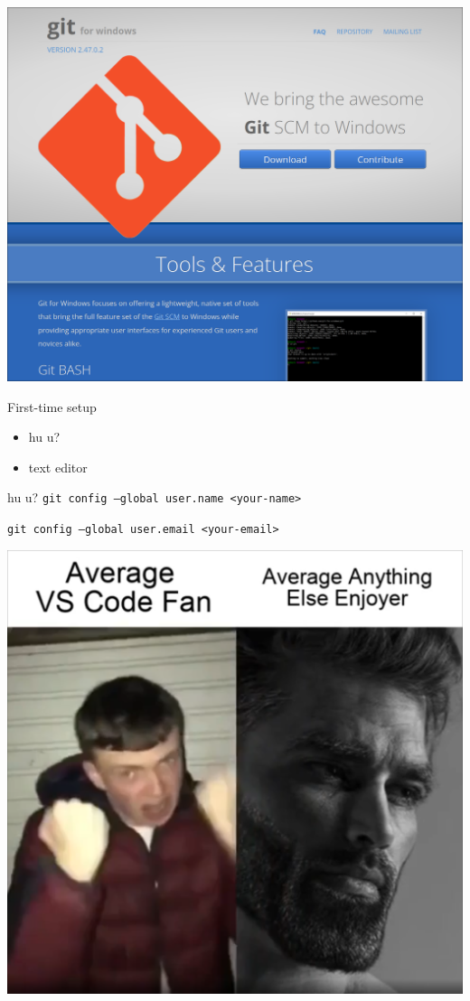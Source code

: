 \documentclass[17pt]{beamer}
\begin{document}
\begin{frame}
  \centering
  \includegraphics[height=\textheight]{git-for-windows}
\end{frame}

\begin{frame}{First-time setup}
  \begin{itemize}
    \item hu u?
    \item text editor
  \end{itemize}
\end{frame}

\begin{frame}{hu u?}
  \texttt{git config --global user.name <your-name>}

  \texttt{git config --global user.email <your-email>}
\end{frame}

\begin{frame}
  \centering
  \includegraphics[height=\textheight]{vscode-meme}
\end{frame}
\end{document}
